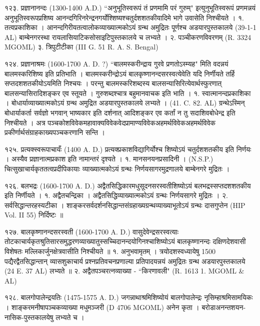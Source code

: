 १२३. प्रज्ञानानन्दः (1300-1400 A.D.)
``अनुभूतिस्वरूपं तं प्रणमामि परं गुरुम्" इत्युनुभूतिस्वरूपं प्रणमन्नयं अनुभूतिस्वरूपप्रशिष्य आनन्दगिरिनरेन्द्रनगर्योश्शिष्यश्चतुर्दशशतकीयादिमे भागे उवासेति निश्चीयते ।
१. तत्वप्रकाशिका । आनन्दगिरीयतत्वालोकव्याख्यात्मकोऽयं ग्रन्थ अमुद्रितः पूर्णश्च अडयारपुस्तकालये (39-1-1 AL) बाम्बेनगरस्था रायलासियाटिकसोसाइटिपुस्तकालये च लभ्यते ।
२. पञ्चीकरणविवरणम् (R. 3324 MGOML)
३. त्रिपुटीटीका (III G. 51 R. A. S. Bengal)

१२४. प्रज्ञानाश्रमः (1600-1700 A. D. ?)
``बालमस्करीन्द्राय गुरवे प्रणतोऽस्म्यह" मिति वदन्नयं बालमस्करिशिष्य इति प्रतिभाति । बालमस्करीन्द्रोऽयं बालकृष्णानन्दसरस्वत्येवेति यदि निर्णीयते तर्हि सप्तदशशतकीयोऽयमिति निश्चयः । परन्तु बालमस्करिशब्दस्य बालसन्यासिरित्येवार्थस्फुरणात् बालसन्यासिरादिशङ्कर एव स्तूयते । गुरुशब्दश्चात्र बहुमानवाचक इति भाति ।
१. स्वात्मानन्दप्रकाशिका । बोधार्याव्याख्यात्मकोऽयं ग्रन्थ अमुद्रित अडयारपुस्तकालये लभ्यते । (41. C. 82. AL) ग्रन्थेऽस्मिन् बोधार्याकर्ता सर्वज्ञो भगवान् भाष्यकार इति दर्शनात् आदिशङ्कर एव कर्तां न तु सदाशिवबोधेन्द्र इति निश्चीयते । अत्र पञ्चकोशविवेकमहावाक्यविवेकवेदप्रामाण्यविवेकअहमर्थविवेकअहमर्थविवेक प्रकीर्णार्थसंग्राहकाख्यपञ्चकरणानि सन्ति ।

१२५. प्रत्यक्स्वरूपाचायँः (1400 A. D.)
प्रत्यक्प्रकाशविद्यागिर्योश्च शिष्योऽयं चतुर्दशशतकीय इति निर्णयः । अस्यैव प्रज्ञानात्मप्रकाश इति नामान्तरं दृश्यते ।
१. मानसनयनप्रसादिनी । (N.S.P.) चित्सुखाचार्यकृततत्वप्रदीपिकायाः व्याख्यात्मकोऽयं ग्रन्थः निर्णयसागरमुद्रणालये बाम्बेनगरे मुद्रितः ।

१२६. बलभद्रः (1600-1700 A. D.)
अद्वैतसिद्धिकारमधुसूदनसरस्वतीशिष्योऽयं बलभद्रस्सप्तदशशतकीय इति निर्णीयते ।
१. अद्वैतचन्द्रिका । अद्वैतसिद्धिव्याख्यात्मकोऽयं ग्रन्थः निर्णयसागरे मुद्रितः ।
२. सर्वसिद्धान्तरहस्यटीका । शाङ्करसर्वदर्शनसिद्धान्तसंग्रहाख्यग्रन्थव्याख्याभूतोऽयं ग्रन्थः दासगुप्तेन (HIP Vol. II 55) निर्दिष्टः ॥

१२७. बालकृष्णानन्दसरस्वती (1600-1700 A. D.)
वासुदेवेन्द्रसरस्वत्याः तोटकाचार्यकृतश्रुतिसारसमुद्धरणव्याख्यातुस्सच्चिदानन्दयोगिनश्चाशिष्योऽयं बालकृष्णानन्दः दक्षिणदेशवासी विशेषतः मल्लिकार्जुनक्षेत्रवासीति निश्चीयते ॥
१. अनुभवामृतम् । त्रयोदशस्वध्यायेषु 1500 पद्यैरद्वैतसिद्धान्तान् व्यासशुकाचार्य प्रश्नप्रतिवचनप्रणाल्या प्रतिपादयन्नयं अमुद्रितः ग्रन्थ अडयारपुस्तकालये (24 E. 37 AL) लभ्यते ॥
२. अद्वैतपञ्चरत्नव्याख्या - ``किरणावली" (R. 1613 1. MGOML & AL)

१२८. बालगोपालेन्द्रयतिः (1475-1575 A. D.)
जगन्नाथाश्रमिशिष्योयं बालगोपालेन्द्रः नृसिम्हाश्रमिसामयिकः । शाङ्करमनीषापञ्चकव्याख्या मधुमञ्जरी (D 4706 MGOML) अनेन कृता । बरोडाअनन्तशयन-नासिक-पुस्तकालयेषु लभ्यते च ।

